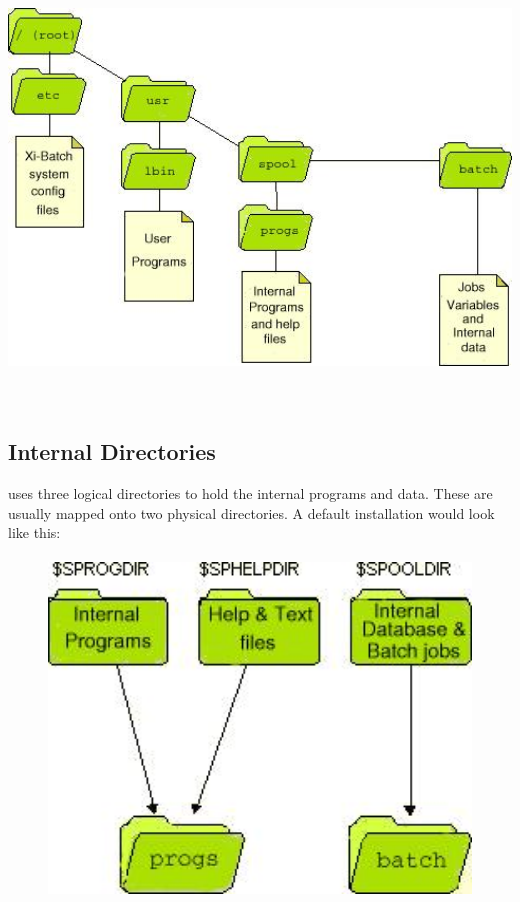  \includegraphics[width=16.953cm,height=11.441cm]{img/ref2.jpg} 

\subsection{Internal Directories}
\ProductName{} uses three logical directories to hold the internal programs and data. These are usually mapped onto two physical directories. A
default installation would look like this:


\begin{figure}
\centering
\includegraphics[width=13.808cm,height=9.065cm]{img/ref3.jpg}
\end{figure}

